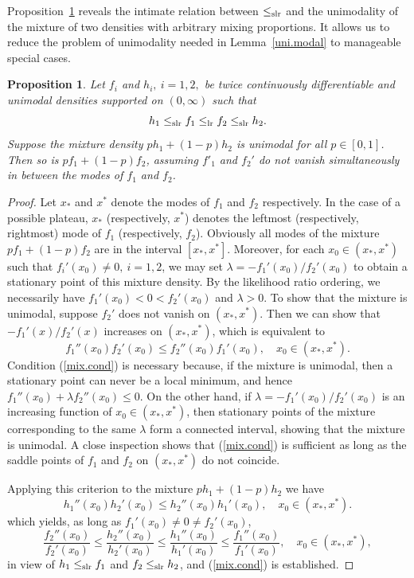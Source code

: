 \documentclass[11pt]{article}
\newtheorem{proposition}{\bf Proposition}
\begin{document}
Proposition~\ref{comp.prop} reveals the intimate relation between $\leq_{\rm slr}$ and the unimodality of the mixture of two densities with arbitrary mixing proportions.  It allows us to reduce the problem of unimodality needed in Lemma~\ref{uni.modal} to manageable special cases.

\begin{proposition}
\label{comp.prop}
Let $f_i$ and $h_i,\ i=1,2,$ be twice continuously differentiable and unimodal densities supported on $(0, \infty)$ such that 
$$h_1\leq_{\rm slr} f_1\leq_{\rm lr} f_2\leq_{\rm slr} h_2.$$  
Suppose the mixture density $p h_1 + (1- p) h_2$ is unimodal for all $p \in [0,1]$.  Then so is $p f_1 + (1-p) f_2$, assuming $f'_1$ and $f_2'$ do not vanish simultaneously in between the modes of $f_1$ and $f_2$. 
\end{proposition}
\begin{proof}
Let $x_*$ and $x^*$ denote the modes of $f_1$ and $f_2$ respectively.  In the case of a possible plateau, $x_*$ (respectively, $x^*$) denotes the leftmost (respectively, rightmost) mode of $f_1$ (respectively, $f_2$).  Obviously all modes of the mixture $p f_1 + (1-p) f_2 $ are in the interval $[x_*, x^*]$.  Moreover, for each $x_0\in (x_*, x^*)$ such that $f_i'(x_0)\neq 0,\ i=1,2$, we may set $\lambda = - f_1'(x_0)/ f_2'(x_0)$ to obtain a stationary point of this mixture density.  By the likelihood ratio ordering, we necessarily have $f_1'(x_0)<0<f_2'(x_0)$ and $\lambda >0$.  To show that the mixture is unimodal, suppose $f_2'$ does not vanish on $(x_*, x^*)$.  Then we can show that $-f_1'(x)/f_2'(x)$ increases on $(x_*, x^*)$, which is equivalent to 
\begin{equation}
\label{mix.cond}
f_1''(x_0) f_2'(x_0) \leq f_2''(x_0) f_1'(x_0),\quad x_0\in (x_*, x^*).
\end{equation}
Condition (\ref{mix.cond}) is necessary because, if the mixture is unimodal, then a stationary point can never be a local minimum, and hence $f_1''(x_0) +\lambda f_2''(x_0) \leq 0$.  On the other hand, if $\lambda = - f_1'(x_0)/f_2'(x_0)$ is an increasing function of $x_0\in (x_*, x^*)$, then stationary points of the mixture corresponding to the same $\lambda$ form a connected interval, showing that the mixture is unimodal.  A close inspection shows that (\ref{mix.cond}) is sufficient as long as the saddle points of $f_1$ and $f_2$ on $(x_*, x^*)$ do not coincide. 

Applying this criterion to the mixture $ph_1 +(1-p) h_2 $ we have
$$h_1''(x_0) h_2'(x_0) \leq h_2''(x_0) h_1'(x_0),\quad x_0\in (x_*, x^*).$$
which yields, as long as $f_1'(x_0)\neq 0\neq f_2'(x_0)$, 
$$ \frac{f_2''(x_0)}{f_2'(x_0)}\leq \frac{h_2''(x_0)}{h_2'(x_0)}\leq \frac{h_1''(x_0)}{h_1'(x_0)} \leq \frac{f_1''(x_0)}{f_1'(x_0)},\quad x_0\in (x_*, x^*),$$
in view of  $h_1\leq_{\rm slr} f_1$ and $f_2\leq_{\rm slr} h_2$, and (\ref{mix.cond}) is established. 
\end{proof}
\end{document}
